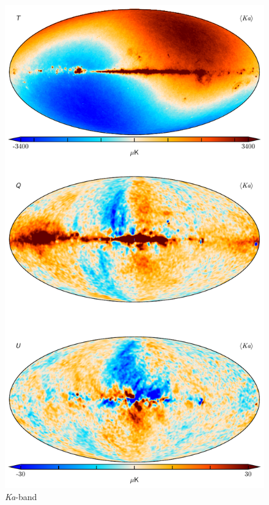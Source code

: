 \documentclass[twocolumn]{../../common/aa}
\newcommand{\Ka}[0]{\textit{Ka}}
\begin{document}
\begin{figure}
	\centering
	\includegraphics[height=0.9\textheight]{figures/030-WMAP_Ka_map.pdf}
	\caption{\Ka-band}
\end{figure}
\end{document}
